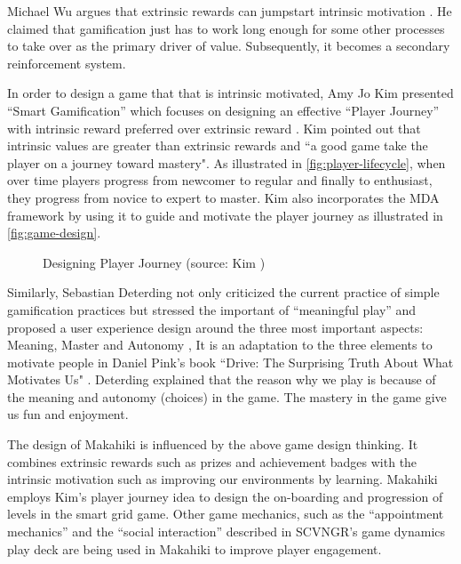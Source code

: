 Michael Wu argues that extrinsic rewards can jumpstart intrinsic motivation  \cite {WuSustainable2011}. He claimed that gamification just has to work long enough for some other processes to take over as the primary driver of value. Subsequently, it becomes a secondary reinforcement system. 

In order to design a game that that is intrinsic motivated, Amy Jo Kim presented ``Smart Gamification'' which focuses on designing an effective ``Player Journey'' with intrinsic reward preferred over extrinsic reward \cite {Kim2010}. Kim pointed out that intrinsic values are greater than extrinsic rewards and ``a good game take the player on a journey toward mastery". As illustrated in \autoref{fig:player-lifecycle}, when over time players progress from newcomer to regular and finally to enthusiast, they progress from novice to expert to master. Kim also incorporates the MDA framework \cite {hunicke2004mda} by using it to guide and motivate the player journey as illustrated in \autoref{fig:game-design}.

\begin{figure}[ht!]
	\centering
		\caption{Designing Player Journey (source: Kim \cite {Kim2010})}
		\label{fig:design-player-journey}
\end{figure}

Similarly, Sebastian Deterding not only criticized the current practice of simple gamification practices but stressed the important of ``meaningful play'' and proposed a user experience design around the three most important aspects: Meaning, Master and Autonomy \cite {Deterding2011meaningful}, It is an adaptation to the three elements to motivate people in Daniel Pink's book ``Drive: The Surprising Truth About What Motivates Us" \cite {pink2009drive}. Deterding explained that the reason why we play is because of the meaning and autonomy (choices) in the game. The mastery in the game give us fun and enjoyment.

The design of Makahiki is influenced by the above game design thinking. It combines extrinsic rewards such as prizes and achievement badges with the intrinsic motivation such as improving our environments by learning. Makahiki employs Kim's player journey idea \cite{Kim2010} to design the on-boarding and progression of levels in the smart grid game. Other game mechanics, such as the ``appointment mechanics'' and the ``social interaction'' described in SCVNGR's game dynamics play deck\cite{Biggs2010} are being used in Makahiki to improve player engagement. 

